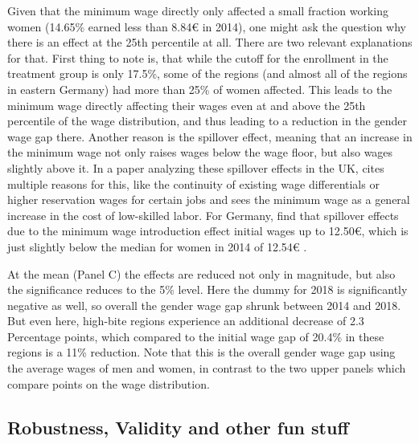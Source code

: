 \documentclass[12pt,draft,a4paper]{article}
\begin{document}
Given that the minimum wage directly only affected a small fraction working women (14.65\% earned less than 8.84€ in 2014), one might ask the question why there is an effect at the 25th percentile at all.
There are two relevant explanations for that.
First thing to note is, that while the cutoff for the enrollment in the treatment group is only 17.5\%,
some of the regions (and almost all of the regions in eastern Germany)
had more than 25\% of women affected. This leads to the minimum wage directly affecting their wages even at and above the 25th percentile of the wage distribution, and thus leading to a reduction in the gender wage gap there.
Another reason is the spillover effect, meaning that an increase in the minimum wage not only raises wages below the wage floor, but also wages slightly above it.
In a paper analyzing these spillover effects in the UK, \citet{Stewart12Wage} cites multiple reasons for this, like the continuity of existing wage differentials or higher reservation wages for certain jobs and sees the minimum wage as a general increase in the cost of low-skilled labor.
For Germany, \citet{Dustman21Reallocation} find that spillover effects due to the minimum wage introduction effect initial wages up to 12.50€, which is just slightly below the median for women in 2014 of 12.54€ \citep[see][Table 1]{CALIENDO22}. 

At the mean (Panel C) the effects are reduced not only in magnitude, but also the significance reduces to the 5\% level. 
Here the dummy for 2018 is significantly negative as well, so overall the gender wage gap shrunk between 2014 and 2018.
But even here, high-bite regions experience an additional decrease of 2.3 Percentage points, which compared to the initial wage gap of 20.4\% in these regions is a 11\% reduction.
Note that this is the overall gender wage gap using the average wages of men and women, in contrast to the two upper panels which compare points on the wage distribution.

\subsection{Robustness, Validity and other fun stuff}
\end{document}
